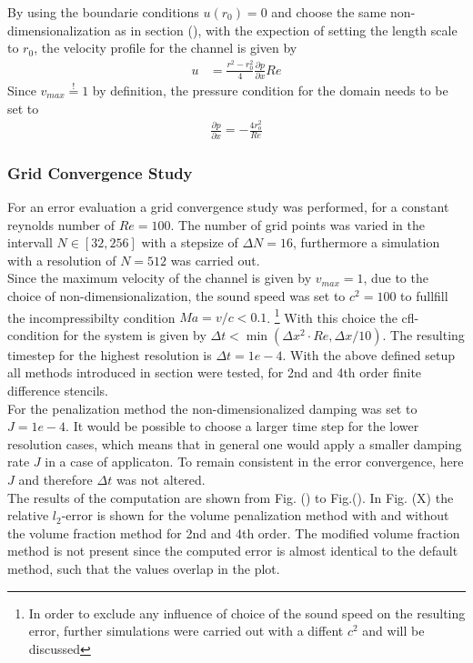 By using the boundarie conditions $u(r_0) = 0$ and choose the same non-dimensionalization as in section (), with the expection of setting the length scale to $r_0$,
the velocity profile for the channel is given by
\begin{align}
    u &= \frac{r^2 - r_0^2}{4}\frac{\partial p}{\partial x}Re
\end{align}
Since $v_{max} \stackrel{!}{=} 1$ by definition, the pressure condition for the domain needs to be set to
\begin{align}
    \frac{\partial p}{\partial x} = -\frac{4 r_o^2}{Re}
\end{align}

\subsubsection{Grid Convergence Study}

For an error evaluation a grid convergence study was performed, for a constant reynolds number of $Re=100$.
The number of grid points was varied in the intervall $N\in[32, 256]$ with a stepsize of $\Delta N = 16$, furthermore a
simulation with a resolution of $N=512$ was carried out.\\
Since the maximum velocity of the channel is given by $v_{max}=1$, due to the choice of non-dimensionalization,
the sound speed was set to $c^2 = 100$ to fullfill the incompressibilty condition $Ma = v/c < 0.1$. \footnote{In order to exclude
any influence of choice of the sound speed on the resulting error, further simulations were carried out with a diffent $c^2$ and will be discussed}
With this choice the cfl-condition for the system is given by $\Delta t < \min(\Delta x^2 \cdot Re, \Delta x / 10)$.
The resulting timestep for the highest resolution is $\Delta t = 1e-4$.
With the above defined setup all methods introduced in section were tested, for 2nd and 4th order finite difference stencils.\\
For the penalization method the non-dimensionalized damping was set to $J=1e-4$.
It would be possible to choose a larger time step for the lower resolution cases, which means that in general
one would apply a smaller damping rate $J$ in a case of applicaton. To remain consistent in the error convergence, here $J$ and
therefore $\Delta t$ was not altered.\\
The results of the computation are shown from Fig. () to Fig.().
In Fig. (X) the relative $l_2$-error is shown for the volume penalization method with and without the volume fraction method
for 2nd and 4th order. The modified volume fraction method is not present since the computed error is almost identical to the default method,
such that the values overlap in the plot.

